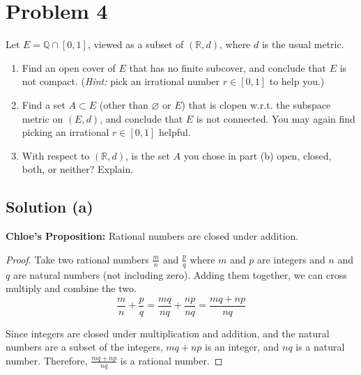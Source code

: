 \documentclass[11pt]{article}
\begin{document}
\section{Problem 4}
    Let $E = \mathbb{Q} \cap [0, 1]$, viewed as a subset of $(\mathbb{R}, d)$, where $d$ is the usual metric.
    \begin{enumerate}[label=(\alph*)]
        \item 
        Find an open cover of $E$ that has no finite subcover, and conclude that $E$ is not compact. (\textit{Hint:} pick an irrational number $r \in [0, 1]$ to help you.)

        \item 
        Find a set $A \subset E$ (other than $\varnothing$ or $E$) that is clopen w.r.t. the subspace metric on $(E, d)$, and conclude that $E$ is not connected. You may again find picking an irrational $r \in [0, 1]$ helpful.

        \item 
        With respect to $(\mathbb{R}, d)$, is the set $A$ you chose in part (b) open, closed, both, or neither? Explain.
        
    \end{enumerate}
    
    \subsection{Solution (a)}
        \textbf{Chloe's Proposition:}
            Rational numbers are closed under addition.
        \begin{proof}
            Take two rational numbers $\frac{m}{n}$ and $\frac{p}{q}$ where $m$ and $p$ are integers and $n$ and $q$ are natural numbers (not including zero).
            Adding them together, we can cross multiply and combine the two.
            \begin{equation}
                \frac{m}{n} + \frac{p}{q}   =   \frac{mq}{nq} + \frac{np}{nq}
                    =   \frac{mq + np}{nq}
            \end{equation}

            Since integers are closed under multiplication and addition, and the natural numbers are a subset of the integers, $mq + np$ is an integer, and $nq$ is a natural number.
            Therefore, $\frac{mq + np}{nq}$ is a rational number.
        \end{proof}
        
\end{document}
